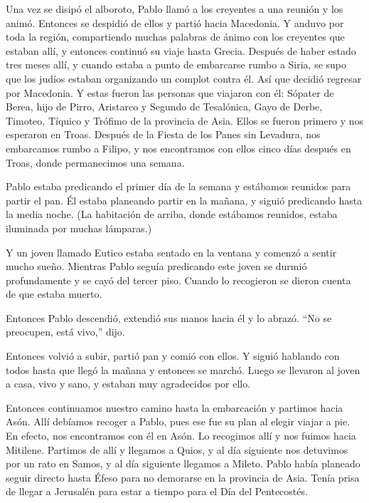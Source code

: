  Una vez se disipó el alboroto, Pablo llamó a los creyentes
a una reunión y los animó. Entonces se despidió de ellos y partió hacia
Macedonia.  Y anduvo por toda la región, compartiendo muchas
palabras de ánimo con los creyentes que estaban allí, y entonces
continuó su viaje hasta Grecia.  Después de haber estado
tres meses allí, y cuando estaba a punto de embarcarse rumbo a Siria, se
supo que los judíos estaban organizando un complot contra él. Así que
decidió regresar por Macedonia.  Y estas fueron las personas
que viajaron con él: Sópater de Berea, hijo de Pirro, Aristarco y
Segundo de Tesalónica, Gayo de Derbe, Timoteo, Tíquico y Trófimo de la
provincia de Asia.  Ellos se fueron primero y nos esperaron
en Troas.  Después de la Fiesta de los Panes sin Levadura,
nos embarcamos rumbo a Filipo, y nos encontramos con ellos cinco días
después en Troas, donde permanecimos una semana.

 Pablo estaba predicando el primer día de la semana y
estábamos reunidos para partir el pan. Él estaba planeando partir en la
mañana, y siguió predicando hasta la media noche.  (La
habitación de arriba, donde estábamos reunidos, estaba iluminada por
muchas lámparas.)

 Y un joven llamado Eutico estaba sentado en la ventana y
comenzó a sentir mucho sueño. Mientras Pablo seguía predicando este
joven se durmió profundamente y se cayó del tercer piso. Cuando lo
recogieron se dieron cuenta de que estaba muerto.

 Entonces Pablo descendió, extendió sus manos hacia él y lo
abrazó. ``No se preocupen, está vivo,'' dijo.

 Entonces volvió a subir, partió pan y comió con ellos. Y
siguió hablando con todos hasta que llegó la mañana y entonces se
marchó.  Luego se llevaron al joven a casa, vivo y sano, y
estaban muy agradecidos por ello.

 Entonces continuamos nuestro camino hasta la embarcación y
partimos hacia Asón. Allí debíamos recoger a Pablo, pues ese fue su plan
al elegir viajar a pie.  En efecto, nos encontramos con él
en Asón. Lo recogimos allí y nos fuimos hacia Mitilene. 
Partimos de allí y llegamos a Quios, y al día siguiente nos detuvimos
por un rato en Samos, y al día siguiente llegamos a Mileto.
 Pablo había planeado seguir directo hasta Éfeso para no
demorarse en la provincia de Asia. Tenía prisa de llegar a Jerusalén
para estar a tiempo para el Día del Pentecostés.


